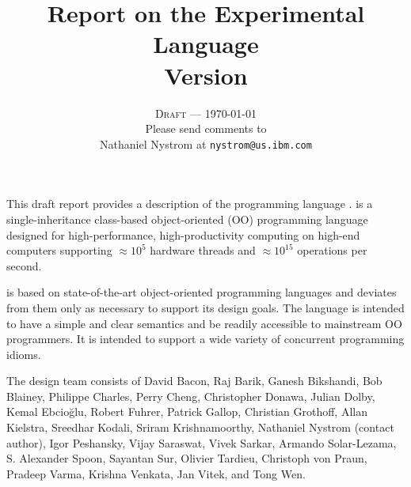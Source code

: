 
\thispagestyle{empty}


\title{Report on the Experimental Language \Xten \\
\large Version \integerversion}
\author{\textsc{Draft} --- \today \\
Please send comments to \\
Nathaniel Nystrom at \texttt{nystrom@us.ibm.com}}
\date{}

\maketitle

\newcommand\authorsc[1]{#1}

This draft report provides a description of the programming
language \Xten. \Xten{} is a single-inheritance class-based object-oriented
(OO) programming language designed for high-performance, high-productivity
computing on high-end computers supporting $\approx 10^5$ hardware threads
and $\approx 10^{15}$ operations per second. 

{}\Xten{} is based on state-of-the-art object-oriented programming
languages and deviates from them only as necessary to support its
design goals. The language is intended to have a simple and clear
semantics and be readily accessible to mainstream OO programmers. It
is intended to support a wide variety of concurrent programming
idioms.


The \Xten{} design team consists of
\authorsc{David Bacon}, 
\authorsc{Raj Barik}, 
\authorsc{Ganesh Bikshandi}, 
\authorsc{Bob Blainey}, 
\authorsc{Philippe Charles}, 
\authorsc{Perry Cheng}, 
\authorsc{Christopher Donawa}, 
\authorsc{Julian Dolby}, 
\authorsc{Kemal Ebcio\u{g}lu},
\authorsc{Robert Fuhrer},
\authorsc{Patrick Gallop}, 
\authorsc{Christian Grothoff}, 
\authorsc{Allan Kielstra}, 
\authorsc{Sreedhar Kodali}, 
\authorsc{Sriram Krishnamoorthy}, 
\authorsc{Nathaniel Nystrom} (contact author),  
\authorsc{Igor Peshansky}, 
\authorsc{Vijay Saraswat},
\authorsc{Vivek Sarkar},
\authorsc{Armando Solar-Lezama},  
\authorsc{S. Alexander Spoon}, 
\authorsc{Sayantan Sur}, 
\authorsc{Olivier Tardieu},
\authorsc{Christoph von Praun},
\authorsc{Pradeep Varma},
\authorsc{Krishna Venkata},
\authorsc{Jan Vitek}, and
\authorsc{Tong Wen}.

